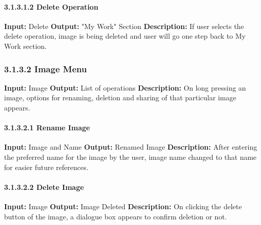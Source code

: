 \documentclass{scrreprt}
\begin{document}
\paragraph{3.1.3.1.2 Delete Operation}
\hfill \vspace{2.5mm} \break 
\textbf{Input:} Delete \newline
\textbf{Output:} "My Work" Section
\vspace{1mm}\newline
\textbf{Description:} \newline 
If user selects the delete operation, image is being deleted and user will go one step back to My Work section.

\subsubsection{3.1.3.2 Image Menu}
\textbf{Input:} Image \newline
\textbf{Output:} List of operations
\vspace{1mm}\newline
\textbf{Description:} \newline 
On long pressing an image, options for renaming, deletion and sharing of that particular image appears.

\paragraph{3.1.3.2.1 Rename Image}
\hfill \vspace{2.5mm} \break 
\textbf{Input:} Image and Name \newline
\textbf{Output:} Renamed Image
\vspace{1mm}\newline
\textbf{Description:} \newline 
After entering the preferred name for the image by the user, image name changed to that name for easier future references.

\paragraph{3.1.3.2.2 Delete Image}
\hfill \vspace{2.5mm} \break 
\textbf{Input:} Image \newline
\textbf{Output:} Image Deleted
\vspace{1mm}\newline
\textbf{Description:} \newline 
On clicking the delete button of the image, a dialogue box appears to confirm deletion or not.
\end{document}
